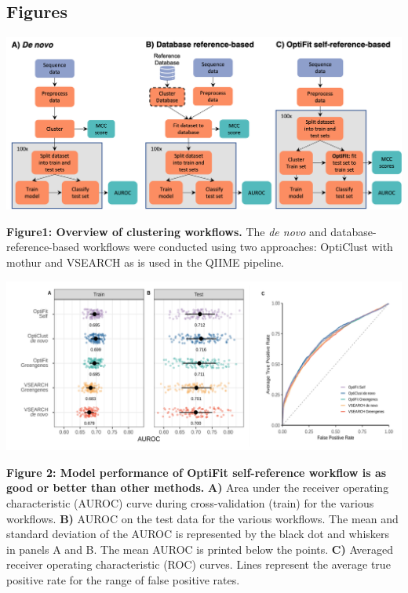 \documentclass[
]{article}
\begin{document}
\setlength{\parindent}{0in}
\setlength{\leftskip}{0in}

\newpage

\hypertarget{figures}{%
\subsection{Figures}\label{figures}}

\includegraphics{./figures/Figure1.png}

\textbf{Figure1: Overview of clustering workflows.} The \emph{de novo}
and database-reference-based workflows were conducted using two
approaches: OptiClust with mothur and VSEARCH as is used in the QIIME
pipeline.

\newpage

\includegraphics{figures/fig2.png}

\textbf{Figure 2: Model performance of OptiFit self-reference workflow
is as good or better than other methods.} \textbf{A)} Area under the
receiver operating characteristic (AUROC) curve during cross-validation
(train) for the various workflows. \textbf{B)} AUROC on the test data
for the various workflows. The mean and standard deviation of the AUROC
is represented by the black dot and whiskers in panels A and B. The mean
AUROC is printed below the points. \textbf{C)} Averaged receiver
operating characteristic (ROC) curves. Lines represent the average true
positive rate for the range of false positive rates.
\end{document}
